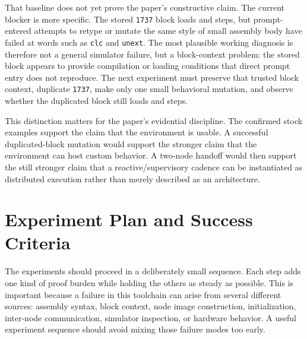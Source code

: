 \documentclass[11pt]{article}
\begin{document}
That baseline does not yet prove the paper's constructive claim. The
current blocker is more specific. The stored \texttt{1737} block loads and
steps, but prompt-entered attempts to retype or mutate the same style of
small assembly body have failed at words such as \texttt{clc} and
\texttt{unext}. The most plausible working diagnosis is therefore not a
general simulator failure, but a block-context problem: the stored block
appears to provide compilation or loading conditions that direct prompt
entry does not reproduce. The next experiment must preserve that trusted
block context, duplicate \texttt{1737}, make only one small behavioral
mutation, and observe whether the duplicated block still loads and steps.

This distinction matters for the paper's evidential discipline. The
confirmed stock examples support the claim that the environment is usable.
A successful duplicated-block mutation would support the stronger claim
that the environment can host custom behavior. A two-node handoff would then
support the still stronger claim that a reactive/supervisory cadence can be
instantiated as distributed execution rather than merely described as an
architecture.

\section{Experiment Plan and Success Criteria}

The experiments should proceed in a deliberately small sequence. Each step
adds one kind of proof burden while holding the others as steady as
possible. This is important because a failure in this toolchain can arise
from several different sources: assembly syntax, block context, node image
construction, initialization, inter-node communication, simulator
inspection, or hardware behavior. A useful experiment sequence should avoid
mixing those failure modes too early.
\end{document}
